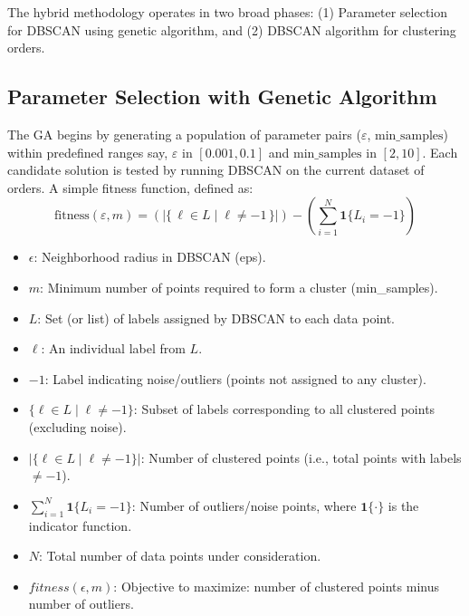 The hybrid methodology operates in two broad phases: (1) Parameter selection for DBSCAN using genetic algorithm, and (2) DBSCAN algorithm for clustering orders.

\subsection{Parameter Selection with Genetic Algorithm}

The GA begins by generating a population of parameter pairs ($\varepsilon$, $\text{min\_samples}$) within predefined ranges say, $\varepsilon$ in $[0.001, 0.1]$ and $\text{min\_samples}$ in $[2, 10]$. Each candidate solution is tested by running DBSCAN on the current dataset of orders. A simple fitness function, defined as:
\begin{equation}
    \text{fitness}(\varepsilon, m) = \left( |\{\, \ell \in L \mid \ell \neq -1 \,\}| \right) - \left( \sum_{i=1}^{N} \mathbf{1}\{L_i = -1\} \right)
    \label{eq:fitness}
\end{equation}

\begin{itemize}
    \item \textbf{$\epsilon$}: Neighborhood radius in DBSCAN (eps).
    \item \textbf{$m$}: Minimum number of points required to form a cluster (min\_samples).
    \item \textbf{$L$}: Set (or list) of labels assigned by DBSCAN to each data point.
    \item \textbf{$\ell$}: An individual label from $L$.
    \item \textbf{$-1$}: Label indicating noise/outliers (points not assigned to any cluster).
    \item \textbf{$\{\ell \in L \mid \ell \neq -1\}$}: Subset of labels corresponding to all clustered points (excluding noise).
    \item \textbf{$\bigl|\{\ell \in L \mid \ell \neq -1\}\bigr|$}: Number of clustered points (i.e., total points with labels $\neq -1$).
    \item \textbf{$\sum_{i=1}^{N} \mathbf{1}\{L_i = -1\}$}: Number of outliers/noise points, where $\mathbf{1}\{\cdot\}$ is the indicator function.
    \item \textbf{$N$}: Total number of data points under consideration.
    \item \textbf{$fitness(\epsilon, m)$}: Objective to maximize: number of clustered points minus number of outliers.
\end{itemize}


